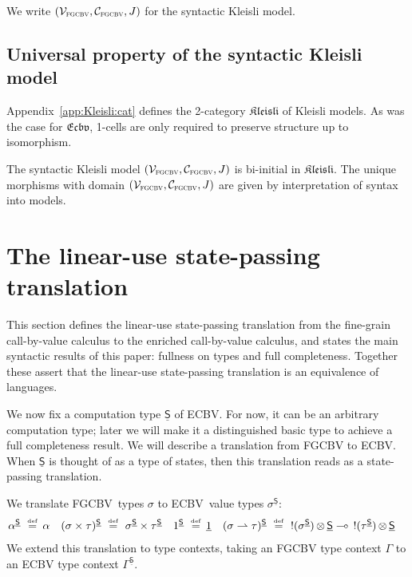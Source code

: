 \documentclass{LMCS}
\newcommand{\STA}{\sigma}
\newcommand{\STB}{\tau}
\newcommand{\EECarbstate}{\comptype{\mathsf{S}}}
\newcommand{\svar}s
\newcommand{\pto}{\rightharpoonup}
\newcommand{\comptype}[1]{\underline{#1}}
\newcommand{\VconstA}{\alpha}
\newcommand{\tensor}{\otimes}
\newcommand{\ltensortype}[2]{{!} #1 \, {\tensor} \, #2}
\newcommand{\prodtype}{\times}
\newcommand{\lfun}{\multimap}
\newcommand{\algone}{{\underline 1}} \newcommand{\valone}{{1}} \newcommand{\algzero}{\comptype{0}}
\newcommand{\FGCBV}{FGCBV}
\newcommand{\ECBV}{ECBV}
\newcommand{\CBVtoEEC}[1]{#1^{\circ}}
\newcommand{\CBVtoEECbase}[2]{#2^{#1}}
\newcommand{\SynKlModel}{(\VSynKl,\CSynKl, J)}
\newcommand{\VSynKl}{\mathcal{V}_{\textsc{fgcbv}}}
\newcommand{\CSynKl}{\mathcal{C}_{\textsc{fgcbv}}}
\newcommand{\CATECBV}{\TwoCatFont{Ecbv}}
\newcommand{\Freyd}{\TwoCatFont{Kleisli}}
\newcommand{\TwoCatFont}[1]{\mathfrak{#1}}
\newcommand{\defeq}{\mathrel{\,\stackrel{\mbox{\tiny{$\mathrm{def}$}}}=\,}}
\begin{document}
\noindent We write $\SynKlModel$ for the syntactic Kleisli model.

\subsection{Universal property of the syntactic Kleisli model}
\label{sec:syn:Kl:biinitial}

Appendix~\ref{app:Kleisli:cat} defines the 2-category $\Freyd$ of Kleisli models. As was the case for $\CATECBV$, 
1-cells are only required to preserve structure up to isomorphism. 

\begin{thm} \label{thm:fgcbv:biinitial}
The syntactic Kleisli model $\SynKlModel$ is bi-initial in $\Freyd$. The unique 
morphisms with domain $\SynKlModel$ are given by interpretation of syntax into models.
\end{thm}





\section{The linear-use state-passing translation}
\label{sec:translation}

This section defines the linear-use state-passing translation
from the fine-grain call-by-value calculus to 
the enriched call-by-value calculus, 
and states the main syntactic results of this paper:
fullness on types and full completeness. Together these assert that 
the linear-use state-passing translation is an equivalence of languages.

We now fix a computation type $\EECarbstate$ of \ECBV.
For now, it can be an arbitrary computation type; later
we will make it a distinguished basic type to achieve a 
full completeness result.
We will describe a translation 
from {\FGCBV} to {\ECBV}. 
When $\EECarbstate$ is thought of as a type of states,
then this translation reads as a state-passing translation.

\renewcommand{\CBVtoEEC}{\CBVtoEECbase\EECarbstate}
\newcommand{\CBVtoEECV}{\CBVtoEECbase \EECarbstate}
\newcommand{\CBVtoEECP}[1]{\CBVtoEECbase \EECarbstate{#1}_\svar}
We translate \FGCBV\ types $\sigma$ to \ECBV\ value types
$\CBVtoEEC\sigma$:
\begin{align*}
\CBVtoEEC{\alpha} & \, \defeq \VconstA &
\CBVtoEEC{(\STA \times \STB)} & \, \defeq\, 
\CBVtoEEC{\STA} \prodtype \CBVtoEEC{\STB} &
\CBVtoEEC{1} & \, \defeq \algone&
\CBVtoEEC{(\STA \pto \STB)} & \, \defeq \, \ltensortype{(\CBVtoEEC{\STA})}{\EECarbstate} \lfun \, \ltensortype{(\CBVtoEEC{\STB})}{\EECarbstate}
\end{align*}
We extend this translation to type contexts,
taking an FGCBV type context $\Gamma$ to an
ECBV type context $\CBVtoEEC\Gamma$.
\end{document}
